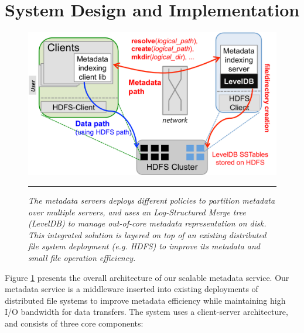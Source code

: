 \section{System Design and Implementation}

\begin{figure}[!hb]   %
\centerline{\includegraphics[scale=0.35]{./figs/giga-impl-leveldb-clusterfs}}
\vspace{10pt}
\caption{\textit{\footnotesize
The metadata servers deploys different policies to partition metadata
over multiple servers, and uses an Log-Structured Merge tree (LevelDB)
to manage out-of-core metadata representation on disk.
This integrated solution is layered on top of an existing distributed
file system deployment (e.g. HDFS) to improve its metadata and
small file operation efficiency.
}}
\hrule
\label{fig:design}
\end{figure}       %

Figure \ref{fig:design} presents the overall architecture of our scalable
metadata service. Our metadata service is a middleware inserted into
existing deployments of distributed file systems to improve metadata efficiency
while maintaining high I/O bandwidth for data transfers.
The system uses a client-server architecture,
and consists of three core components:

